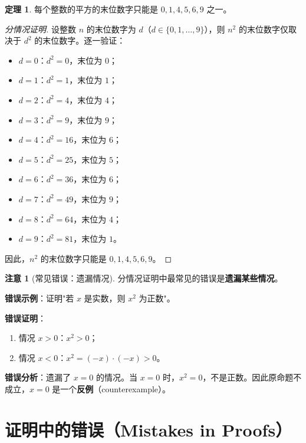 \documentclass[UTF8,11pt,a4paper]{ctexbook}   %
\theoremstyle{definition}
\newtheorem{theorem}{定理}[section]
\newtheorem{warning}{注意}[section]
\begin{document}
\begin{theorem}
每个整数的平方的末位数字只能是 $0, 1, 4, 5, 6, 9$ 之一。
\end{theorem}

\begin{proof}[分情况证明]
设整数 $n$ 的末位数字为 $d$（$d \in \{0,1,\dots,9\}$），则 $n^2$ 的末位数字仅取决于 $d^2$ 的末位数字。逐一验证：
\begin{itemize}
    \item $d=0$：$d^2=0$，末位为 $0$；
    \item $d=1$：$d^2=1$，末位为 $1$；
    \item $d=2$：$d^2=4$，末位为 $4$；
    \item $d=3$：$d^2=9$，末位为 $9$；
    \item $d=4$：$d^2=16$，末位为 $6$；
    \item $d=5$：$d^2=25$，末位为 $5$；
    \item $d=6$：$d^2=36$，末位为 $6$；
    \item $d=7$：$d^2=49$，末位为 $9$；
    \item $d=8$：$d^2=64$，末位为 $4$；
    \item $d=9$：$d^2=81$，末位为 $1$。
\end{itemize}
因此，$n^2$ 的末位数字只能是 $0,1,4,5,6,9$。
\end{proof}

\begin{warning}[常见错误：遗漏情况]
分情况证明中最常见的错误是\textbf{遗漏某些情况}。

\textbf{错误示例}：证明"若 $x$ 是实数，则 $x^2$ 为正数"。

\textbf{错误证明}：
\begin{enumerate}
    \item 情况 $x > 0$：$x^2 > 0$；
    \item 情况 $x < 0$：$x^2 = (-x) \cdot (-x) > 0$。
\end{enumerate}

\textbf{错误分析}：遗漏了 $x = 0$ 的情况。当 $x = 0$ 时，$x^2 = 0$，不是正数。因此原命题不成立，$x=0$ 是一个\textbf{反例}（counterexample）。
\end{warning}

\section{证明中的错误（Mistakes in Proofs）}
\end{document}
